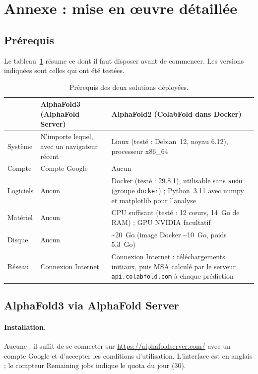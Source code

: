 \section{Annexe : mise en œuvre détaillée}
\label{annexe:miseenoeuvre}

\subsection{Prérequis}

Le tableau~\ref{tab:prerequis} résume ce dont il faut disposer avant de commencer. Les versions indiquées sont celles qui ont été testées.

\begin{table}[H]
\centering
\footnotesize
\begin{tabularx}{\textwidth}{>{\raggedright\arraybackslash}p{2.4cm}>{\raggedright\arraybackslash}X>{\raggedright\arraybackslash}X}
\toprule
 & \textbf{AlphaFold3 (AlphaFold Server)} & \textbf{AlphaFold2 (ColabFold dans Docker)} \\
\midrule
Système & N'importe lequel, avec un navigateur récent & Linux (testé : Debian~12, noyau 6.12), processeur x86\_64 \\
Compte & Compte Google & Aucun \\
Logiciels & Aucun & Docker (testé : 29.8.1), utilisable sans \texttt{sudo} (groupe \texttt{docker}) ; Python~3.11 avec numpy et matplotlib pour l'analyse \\
Matériel & Aucun & CPU suffisant (testé : 12 cœurs, 14~Go de RAM) ; GPU NVIDIA facultatif \\
Disque & Aucun & \textasciitilde 20~Go (image Docker \textasciitilde 10~Go, poids 5,3~Go) \\
Réseau & Connexion Internet & Connexion Internet : téléchargements initiaux, puis MSA calculé par le serveur \texttt{api.colabfold.com} à chaque prédiction \\
\bottomrule
\end{tabularx}
\caption{Prérequis des deux solutions déployées.}
\label{tab:prerequis}
\end{table}

\subsection{AlphaFold3 via AlphaFold Server}
\label{sec:af3_server}

\paragraph{Installation.} Aucune : il suffit de se connecter sur \url{https://alphafoldserver.com/} avec un compte Google et d'accepter les conditions d'utilisation. L'interface est en anglais ; le compteur \og Remaining jobs \fg{} indique le quota du jour (30).

